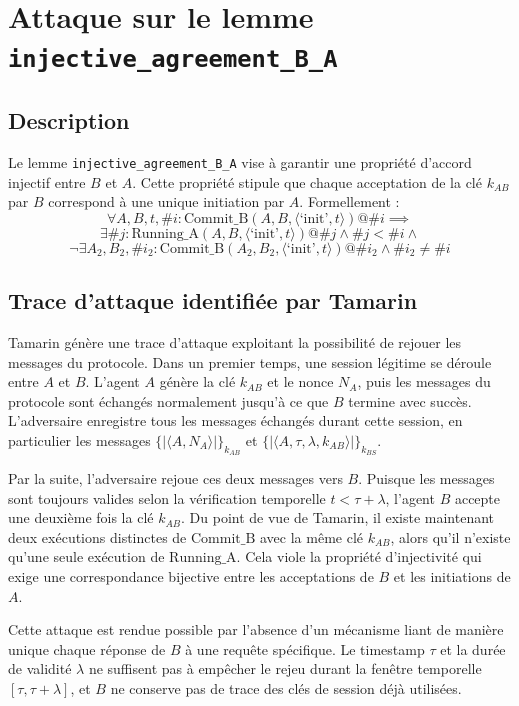 \section{Attaque sur le lemme \texttt{injective\_agreement\_B\_A}}

\subsection{Description}

Le lemme \texttt{injective\_agreement\_B\_A} vise à garantir une propriété d'accord injectif
entre $B$ et $A$. Cette propriété stipule que chaque acceptation de la clé $k_{AB}$ par $B$
correspond à une unique initiation par $A$. Formellement :
\[
    \forall A, B, t, \#i : \text{Commit\_B}(A, B, \langle \text{`init'}, t \rangle) @ \#i \implies
\]
\[
    \exists \#j : \text{Running\_A}(A, B, \langle \text{`init'}, t \rangle) @ \#j \land \#j < \#i \land
\]
\[
    \neg \exists A_2, B_2, \#i_2 : \text{Commit\_B}(A_2, B_2, \langle \text{`init'}, t \rangle) @ \#i_2 \land \#i_2 \neq \#i
\]

\subsection{Trace d'attaque identifiée par Tamarin}

Tamarin génère une trace d'attaque exploitant la possibilité de rejouer les messages du protocole.
Dans un premier temps, une session légitime se déroule entre $A$ et $B$. L'agent $A$ génère la
clé $k_{AB}$ et le nonce $N_A$, puis les messages du protocole sont échangés normalement jusqu'à
ce que $B$ termine avec succès. L'adversaire enregistre tous les messages échangés durant cette
session, en particulier les messages $\{|\langle A, N_A \rangle|\}_{k_{AB}}$ et $\{|\langle A, \tau, \lambda, k_{AB} \rangle|\}_{k_{BS}}$.

Par la suite, l'adversaire rejoue ces deux messages vers $B$. Puisque les messages sont toujours
valides selon la vérification temporelle $t < \tau + \lambda$, l'agent $B$ accepte une deuxième
fois la clé $k_{AB}$. Du point de vue de Tamarin, il existe maintenant deux exécutions distinctes
de $\text{Commit\_B}$ avec la même clé $k_{AB}$, alors qu'il n'existe qu'une seule exécution de
$\text{Running\_A}$. Cela viole la propriété d'injectivité qui exige une correspondance bijective
entre les acceptations de $B$ et les initiations de $A$.

Cette attaque est rendue possible par l'absence d'un mécanisme liant de manière unique chaque
réponse de $B$ à une requête spécifique. Le timestamp $\tau$ et la durée de validité $\lambda$
ne suffisent pas à empêcher le rejeu durant la fenêtre temporelle $[\tau, \tau + \lambda]$, et
$B$ ne conserve pas de trace des clés de session déjà utilisées.

